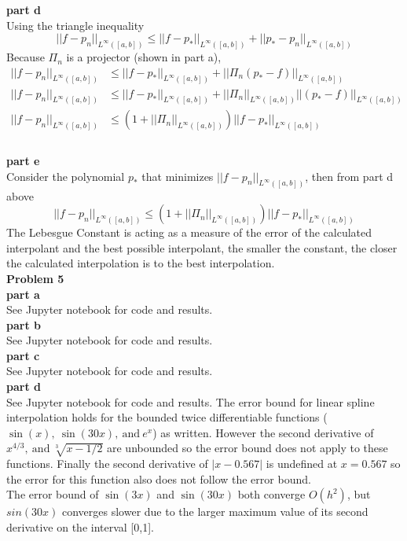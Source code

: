 \documentclass{article} %
\begin{document}
\textbf{part d} \\
Using the triangle inequality
\begin{equation*}
||f - p_n||_{L^\infty([a,b])} \leq ||f - p_*||_{L^\infty([a,b])} + ||p_* - p_n||_{L^\infty([a,b])}
\end{equation*}
Because $\Pi_n$ is a projector (shown in part a),
\begin{align*}
||f - p_n||_{L^\infty([a,b])} &\leq ||f - p_*||_{L^\infty([a,b])} + ||\Pi_n (p_* - f)||_{L^\infty([a,b])} \\
||f - p_n||_{L^\infty([a,b])} &\leq ||f - p_*||_{L^\infty([a,b])} + ||\Pi_n||_{L^\infty([a,b])} ||(p_* - f)||_{L^\infty([a,b])} \\
||f - p_n||_{L^\infty([a,b])} &\leq (1 + ||\Pi_n||_{L^\infty([a,b])})||f - p_*||_{L^\infty([a,b])} \\
\end{align*}
\\

\textbf{part e} \\
Consider the polynomial $p_*$ that minimizes $||f - p_n||_{L^\infty([a,b])}$, then from part d above 
\begin{equation*}
||f - p_n||_{L^\infty([a,b])} \leq (1 + ||\Pi_n||_{L^\infty([a,b])})||f - p_*||_{L^\infty([a,b])}
\end{equation*}
The Lebesgue Constant is acting as a measure of the error of the calculated interpolant and the best possible interpolant, the smaller the constant, the closer the calculated interpolation is to the best interpolation.
\\


\textbf{Problem 5} \\

\textbf{part a} \\
See Jupyter notebook for code and results.
\\

\textbf{part b} \\
See Jupyter notebook for code and results.
\\

\textbf{part c} \\
See Jupyter notebook for code and results.
\\

\textbf{part d} \\
See Jupyter notebook for code and results.
The error bound for linear spline interpolation holds for the bounded twice differentiable functions ($\sin(x),\ \sin(30x),\ \text{and}\ e^x$) as written.  However the second derivative of $x^{4/3},\ \text{and}\ \sqrt[3]{x-1/2}$ are unbounded so the error bound does not apply to these functions.  Finally the second derivative of $|x-0.567|$ is undefined at $x=0.567$ so the error for this function also does not follow the error bound. \\
The error bound of $\sin(3x)$ and $\sin(30x)$ both converge $O(h^2)$, but $sin(30x)$ converges slower due to the larger maximum value of its second derivative on the interval [0,1].
\\
\end{document}
